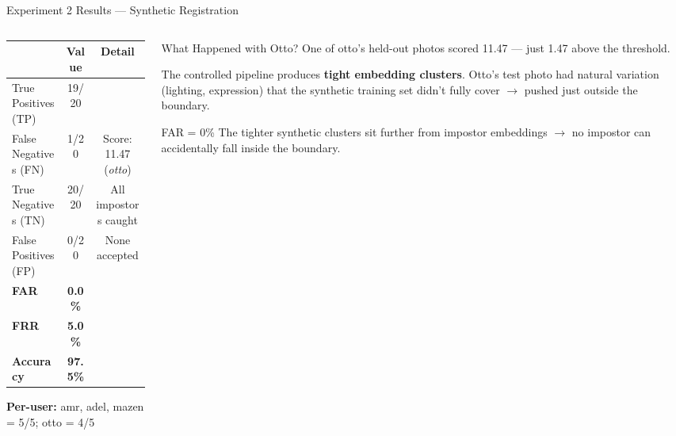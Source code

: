 \documentclass[aspectratio=169]{beamer}
\begin{document}
\begin{frame}{Experiment 2 Results — Synthetic Registration}

\begin{columns}[T]
\begin{column}{0.5\textwidth}
    \begin{center}
    \begin{tabular}{lcc}
    \toprule
    & \textbf{Value} & \textbf{Detail} \\
    \midrule
    True Positives (TP) & 19/20 & \\
    False Negatives (FN) & 1/20  & Score: 11.47 (\textit{otto}) \\
    True Negatives (TN) & 20/20 & All impostors caught \\
    False Positives (FP) & 0/20  & None accepted \\
    \midrule
    \textbf{FAR} & \textbf{0.0\%}  & \\
    \textbf{FRR} & \textbf{5.0\%}  & \\
    \textbf{Accuracy} & \textbf{97.5\%} & \\
    \bottomrule
    \end{tabular}
    \end{center}

    \vspace{8pt}
    \textbf{Per-user:} amr, adel, mazen = 5/5; otto = 4/5
\end{column}
\begin{column}{0.46\textwidth}
    \begin{exampleblock}{What Happened with Otto?}
        \small
        One of otto's held-out photos scored 11.47 — just 1.47 above the threshold.

        The controlled pipeline produces \textbf{tight embedding clusters}. Otto's test photo had natural variation (lighting, expression) that the synthetic training set didn't fully cover $\rightarrow$ pushed just outside the boundary.
    \end{exampleblock}
    \vspace{6pt}
    \begin{alertblock}{FAR = 0\%}
        \small
        The tighter synthetic clusters sit further from impostor embeddings $\rightarrow$ no impostor can accidentally fall inside the boundary.
    \end{alertblock}
\end{column}
\end{columns}
\end{frame}
\end{document}

